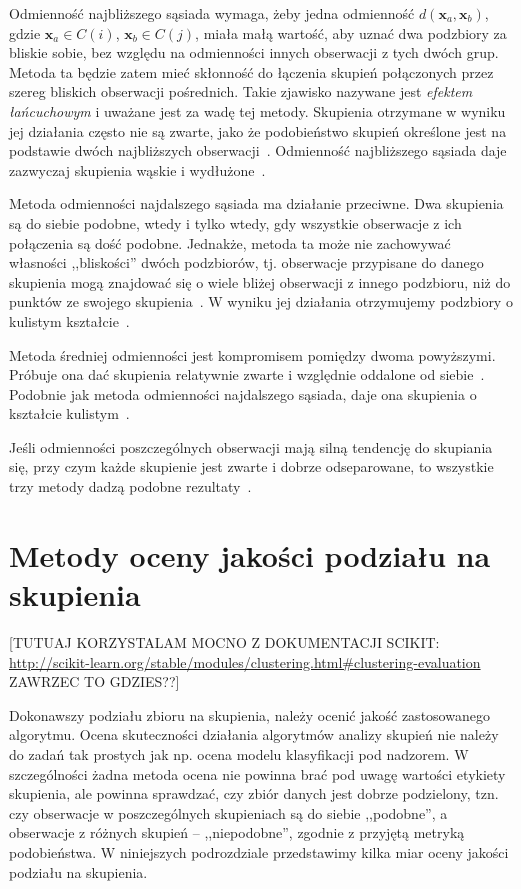 \documentclass{praca1}
\begin{document}
Odmienność najbliższego sąsiada wymaga, żeby jedna odmienność $d(\mathbf{x}_a, \mathbf{x}_b)$, gdzie $\mathbf{x}_a \in C(i)$, $\mathbf{x}_b \in C(j)$, miała małą wartość, aby uznać dwa podzbiory za bliskie sobie, bez względu na odmienności innych obserwacji z tych dwóch grup. Metoda ta będzie zatem mieć skłonność do łączenia skupień połączonych przez szereg bliskich obserwacji pośrednich. Takie zjawisko nazywane jest \emph{efektem łańcuchowym} i uważane jest za wadę tej metody. Skupienia otrzymane w wyniku jej działania często nie są zwarte, jako że podobieństwo skupień określone jest na podstawie dwóch najbliższych obserwacji~\cite{Hastie2009:elements}. Odmienność najbliższego sąsiada daje zazwyczaj skupienia wąskie i wydłużone~\cite{Koronacki2005:statystyczne}. 

Metoda odmienności najdalszego sąsiada ma działanie przeciwne. Dwa skupienia są do siebie podobne, wtedy i tylko wtedy, gdy wszystkie obserwacje z ich połączenia są dość podobne. Jednakże, metoda ta może nie zachowywać własności ,,bliskości'' dwóch podzbiorów, tj. obserwacje przypisane do danego skupienia mogą znajdować się o wiele bliżej obserwacji z innego podzbioru, niż do punktów ze swojego skupienia~\cite{Hastie2009:elements}. W wyniku jej działania otrzymujemy podzbiory o kulistym kształcie~\cite{Koronacki2005:statystyczne}.

Metoda średniej odmienności jest kompromisem pomiędzy dwoma powyższymi. Próbuje ona dać skupienia relatywnie zwarte i względnie oddalone od siebie~\cite{Hastie2009:elements}. Podobnie jak metoda odmienności najdalszego sąsiada, daje ona skupienia o kształcie kulistym~\cite{Koronacki2005:statystyczne}.

Jeśli odmienności poszczególnych obserwacji mają silną tendencję do skupiania się, przy czym każde skupienie jest zwarte i dobrze odseparowane, to wszystkie trzy metody dadzą podobne rezultaty~\cite{Hastie2009:elements}.

\section{Metody oceny jakości podziału na skupienia}

[TUTUAJ KORZYSTALAM MOCNO Z DOKUMENTACJI SCIKIT: \url{http://scikit-learn.org/stable/modules/clustering.html#clustering-evaluation}  ZAWRZEC TO GDZIES??]

Dokonawszy podziału zbioru na skupienia, należy ocenić jakość zastosowanego algorytmu. Ocena skuteczności działania algorytmów analizy skupień nie należy do zadań tak prostych jak np. ocena modelu klasyfikacji pod nadzorem. W szczególności żadna metoda ocena nie powinna brać pod uwagę wartości etykiety skupienia, ale powinna sprawdzać, czy zbiór danych jest dobrze podzielony, tzn. czy obserwacje w poszczególnych skupieniach są do siebie ,,podobne'', a obserwacje z różnych skupień -- ,,niepodobne'', zgodnie z przyjętą metryką podobieństwa. W niniejszych podrozdziale przedstawimy kilka miar oceny jakości podziału na skupienia.
\end{document}
